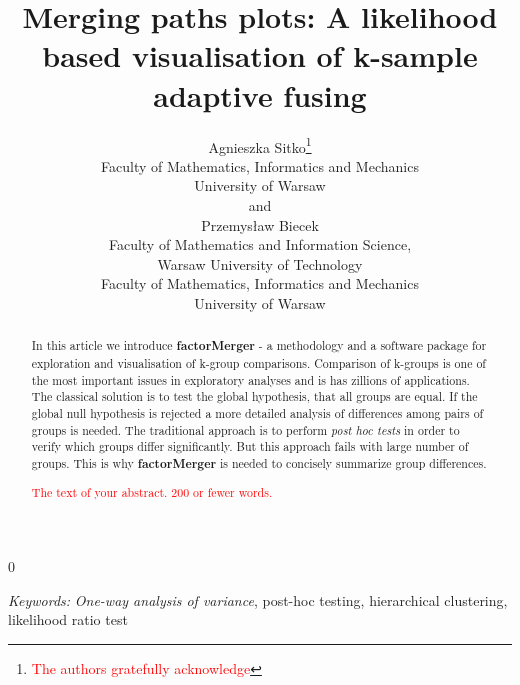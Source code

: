 \documentclass[12pt]{article}
\newcommand{\blind}{0}
\newcommand{\todo}{\textcolor{red}}
\begin{document}
%

\def\spacingset#1{\renewcommand{\baselinestretch}%
{#1}\small\normalsize} \spacingset{1}



\blind
{
  \title{\bf Merging paths plots: A likelihood based visualisation of k-sample adaptive fusing}
  \author{Agnieszka Sitko\thanks{
    \todo{The authors gratefully acknowledge}}\hspace{.2cm}\\
    Faculty of Mathematics,  
    Informatics and Mechanics \\
    University of Warsaw\\
    and \\
    Przemys\l{}aw Biecek \\
    Faculty of Mathematics and Information Science,\\
	Warsaw University of Technology\\
    Faculty of Mathematics,  
    Informatics and Mechanics \\
    University of Warsaw}
  \maketitle
} \fi

\bigskip
\begin{abstract}

In this article we introduce \textbf{factorMerger} - a methodology and a software package for exploration and visualisation of k-group comparisons. Comparison of k-groups is one of the most important issues in exploratory analyses and is has zillions of applications. The classical solution is to test the global hypothesis, that all groups are equal. If the global null hypothesis is rejected a more detailed analysis of differences among pairs of groups is needed. The traditional approach is to perform \emph{post hoc tests} in order to verify which groups differ significantly. But this approach fails with large number of groups. This is why \textbf{factorMerger} is needed to concisely summarize group differences. 

\todo{The text of your abstract.  200 or fewer words.}
\end{abstract}

\noindent%
{\it Keywords:}  \textit{One-way analysis of variance}, post-hoc testing, hierarchical clustering, likelihood ratio test 
\vfill
\end{document}
